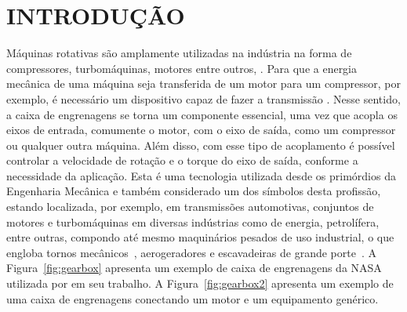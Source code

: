 
\chapter{\normalsize{INTRODUÇÃO}} \label{cap:introdução}

\thispagestyle{empty}

Máquinas rotativas são amplamente utilizadas na indústria na forma de compressores, turbomáquinas, motores entre outros, \cite{rossi2021, souto2000}. Para que a energia mecânica de uma máquina seja transferida de um motor para um compressor, por exemplo, é necessário um dispositivo capaz de fazer a transmissão \cite{murillo2025}. Nesse sentido, a caixa de engrenagens se torna um componente essencial, uma vez que acopla os eixos de entrada, comumente o motor, com o eixo de saída, como um compressor ou qualquer outra máquina. Além disso, com esse tipo de acoplamento é possível controlar a velocidade de rotação e o torque do eixo de saída, conforme a necessidade da aplicação. Esta é uma tecnologia utilizada desde os primórdios da Engenharia Mecânica e também considerado um dos símbolos desta profissão, estando localizada, por exemplo, em transmissões automotivas, conjuntos de motores e turbomáquinas em diversas indústrias como de energia, petrolífera, entre outras, compondo até mesmo maquinários pesados de uso industrial, o que engloba tornos mecânicos~\cite{doughty1988}, aerogeradores e escavadeiras de grande porte~\cite{liang2018b}. A Figura~\ref{fig:gearbox} apresenta um exemplo de caixa de engrenagens da NASA utilizada por  em seu trabalho. 
A Figura~\ref{fig:gearbox2} apresenta um exemplo de uma caixa de engrenagens conectando um motor e um equipamento genérico.

